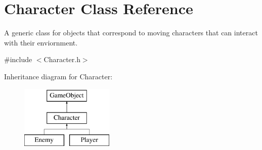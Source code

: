 \hypertarget{class_character}{}\section{Character Class Reference}
\label{class_character}


A generic class for objects that correspond to moving characters that can interact with their enviornment.  




{\ttfamily \#include $<$Character.\+h$>$}

Inheritance diagram for Character\+:\begin{figure}[H]
\begin{center}
\leavevmode
\includegraphics[height=3.000000cm]{class_character}
\end{center}
\end{figure}
